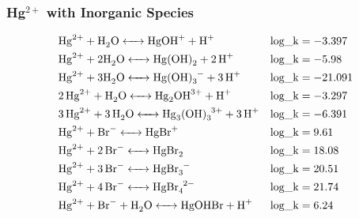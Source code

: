 \documentclass[12pt, a4paper]{article}
\begin{document}
\subsubsection{Hg$^{2+}$ with Inorganic Species}
\begin{align}
& \ce{Hg^2+ + H2O   <->  HgOH+ + H+} &&\mathrm{log\_k} = -3.397 \\
& \ce{Hg^2+ + 2 H2O <->  Hg(OH)2 + 2H+}  &&\mathrm{log\_k} = -5.98 \\
& \ce{Hg^2+ + 3 H2O  <->  Hg(OH)3^- + 3H+} &&\mathrm{log\_k} = -21.091 \\
& \ce{2Hg^2+ + H2O  <->  Hg_2OH^3+ + H+} && \mathrm{log\_k} = -3.297 \\
& \ce{3Hg^2+ + 3H2O  <->  Hg_3(OH)_3^3+ + 3H+} && \mathrm{log\_k} = -6.391 \\
& \ce{Hg^2+ + Br^- <-> HgBr^+} && \mathrm{log\_k} = 9.61 \\
& \ce{Hg^2+ + 2Br^- <-> HgBr2} && \mathrm{log\_k} = 18.08 \\
& \ce{Hg^2+ + 3Br^- <-> HgBr_3^-} && \mathrm{log\_k} = 20.51 \\
& \ce{Hg^2+ + 4Br^- <-> HgBr_4^2-} && \mathrm{log\_k} = 21.74 \\
& \ce{Hg^2+ + Br^- + H2O <-> HgOHBr + H+} && \mathrm{log\_k} = 6.24 \\

\end{align}
\end{document}
